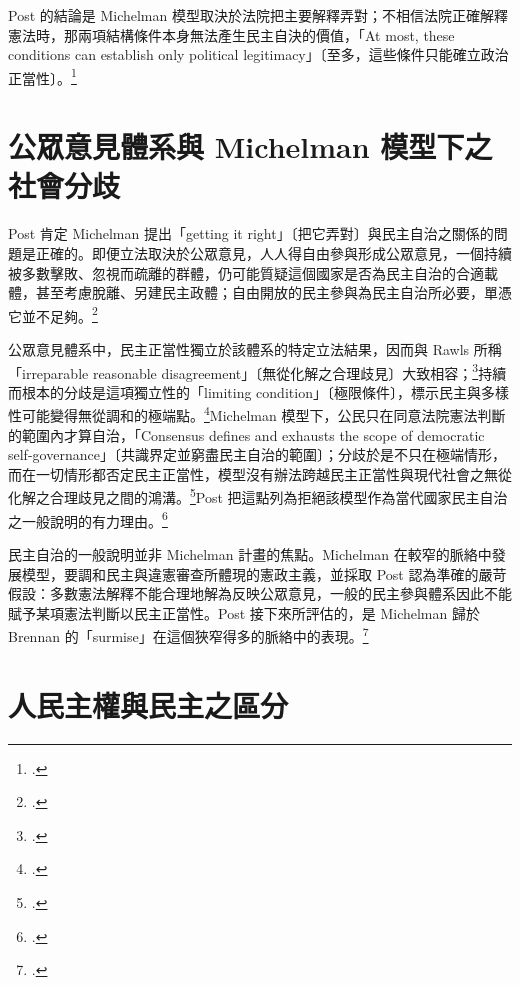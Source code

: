 Post 的結論是 Michelman 模型取決於法院把主要解釋弄對；不相信法院正確解釋憲法時，那兩項結構條件本身無法產生民主自決的價值，「At most, these conditions can establish only political legitimacy」〔至多，這些條件只能確立政治正當性〕。\footcite[436]{post1998}

\section{公眾意見體系與 Michelman 模型下之社會分歧}
\label{sec:60_post-4}

Post 肯定 Michelman 提出「getting it right」〔把它弄對〕與民主自治之關係的問題是正確的。即便立法取決於公眾意見，人人得自由參與形成公眾意見，一個持續被多數擊敗、忽視而疏離的群體，仍可能質疑這個國家是否為民主自治的合適載體，甚至考慮脫離、另建民主政體；自由開放的民主參與為民主自治所必要，單憑它並不足夠。\footcite[436]{post1998}

公眾意見體系中，民主正當性獨立於該體系的特定立法結果，因而與 Rawls 所稱「irreparable reasonable disagreement」〔無從化解之合理歧見〕大致相容；\footcite[436 \& n.28]{post1998}持續而根本的分歧是這項獨立性的「limiting condition」〔極限條件〕，標示民主與多樣性可能變得無從調和的極端點。\footcite[436]{post1998}Michelman 模型下，公民只在同意法院憲法判斷的範圍內才算自治，「Consensus defines and exhausts the scope of democratic self-governance」〔共識界定並窮盡民主自治的範圍〕；分歧於是不只在極端情形，而在一切情形都否定民主正當性，模型沒有辦法跨越民主正當性與現代社會之無從化解之合理歧見之間的鴻溝。\footcite[436--437]{post1998}Post 把這點列為拒絕該模型作為當代國家民主自治之一般說明的有力理由。\footcite[437]{post1998}

民主自治的一般說明並非 Michelman 計畫的焦點。Michelman 在較窄的脈絡中發展模型，要調和民主與違憲審查所體現的憲政主義，並採取 Post 認為準確的嚴苛假設：多數憲法解釋不能合理地解為反映公眾意見，一般的民主參與體系因此不能賦予某項憲法判斷以民主正當性。Post 接下來所評估的，是 Michelman 歸於 Brennan 的「surmise」在這個狹窄得多的脈絡中的表現。\footcite[437]{post1998}

\section{人民主權與民主之區分}
\label{sec:60_post-5}


